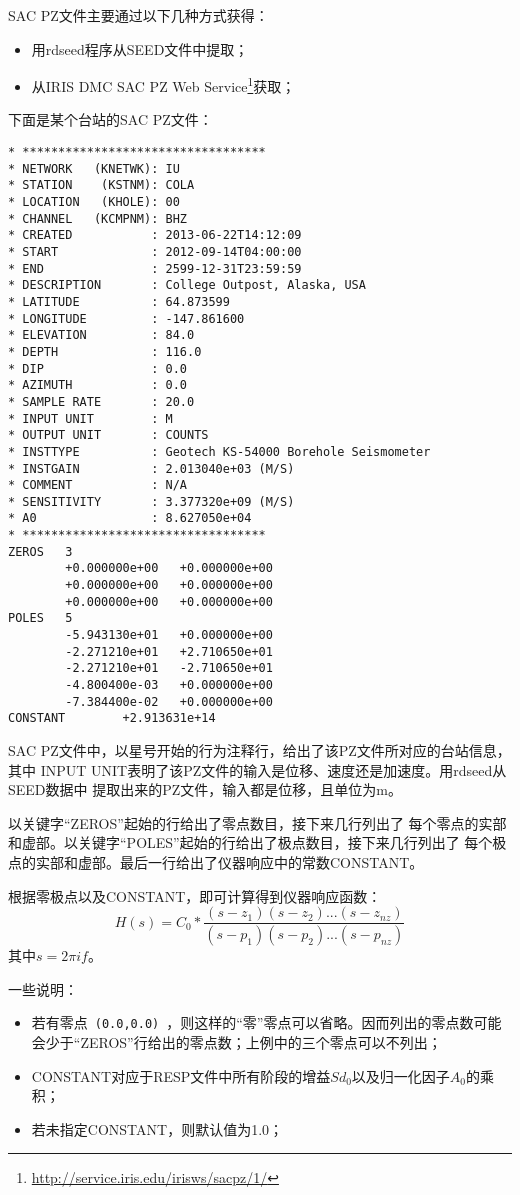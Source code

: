 SAC PZ文件主要通过以下几种方式获得：
\begin{itemize}
\item 用rdseed程序从SEED文件中提取；
\item 从IRIS DMC SAC PZ Web Service\footnote{\url{http://service.iris.edu/irisws/sacpz/1/}}获取；
\end{itemize}

下面是某个台站的SAC PZ文件：
\begin{verbatim}
* **********************************
* NETWORK   (KNETWK): IU
* STATION    (KSTNM): COLA
* LOCATION   (KHOLE): 00
* CHANNEL   (KCMPNM): BHZ
* CREATED           : 2013-06-22T14:12:09
* START             : 2012-09-14T04:00:00
* END               : 2599-12-31T23:59:59
* DESCRIPTION       : College Outpost, Alaska, USA
* LATITUDE          : 64.873599
* LONGITUDE         : -147.861600
* ELEVATION         : 84.0
* DEPTH             : 116.0
* DIP               : 0.0
* AZIMUTH           : 0.0
* SAMPLE RATE       : 20.0
* INPUT UNIT        : M
* OUTPUT UNIT       : COUNTS
* INSTTYPE          : Geotech KS-54000 Borehole Seismometer
* INSTGAIN          : 2.013040e+03 (M/S)
* COMMENT           : N/A
* SENSITIVITY       : 3.377320e+09 (M/S)
* A0                : 8.627050e+04
* **********************************
ZEROS   3
        +0.000000e+00   +0.000000e+00
        +0.000000e+00   +0.000000e+00
        +0.000000e+00   +0.000000e+00
POLES   5
        -5.943130e+01   +0.000000e+00
        -2.271210e+01   +2.710650e+01
        -2.271210e+01   -2.710650e+01
        -4.800400e-03   +0.000000e+00
        -7.384400e-02   +0.000000e+00
CONSTANT        +2.913631e+14
\end{verbatim}

SAC PZ文件中，以星号开始的行为注释行，给出了该PZ文件所对应的台站信息，其中
INPUT UNIT表明了该PZ文件的输入是位移、速度还是加速度。用rdseed从SEED数据中
提取出来的PZ文件，输入都是位移，且单位为m。

以关键字``ZEROS''起始的行给出了零点数目，接下来几行列出了
每个零点的实部和虚部。以关键字``POLES''起始的行给出了极点数目，接下来几行列出了
每个极点的实部和虚部。最后一行给出了仪器响应中的常数CONSTANT。

根据零极点以及CONSTANT，即可计算得到仪器响应函数：
\[
    H(s) = C_0 * \frac{(s-z_1)(s-z_2)...(s-z_{nz})}{(s-p_1)(s-p_2)...(s-p_{nz})}
\]
其中$s=2\pi i f$。

一些说明：
\begin{itemize}
\item 若有零点~\verb+(0.0,0.0)+~，则这样的``零''零点可以省略。因而列出的零点数可能会少于``ZEROS''行给出的零点数；上例中的三个零点可以不列出；
\item CONSTANT对应于RESP文件中所有阶段的增益$Sd_0$以及归一化因子$A_0$的乘积；
\item 若未指定CONSTANT，则默认值为1.0；
\end{itemize}

